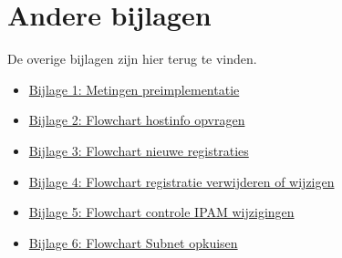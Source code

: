 \documentclass[dutch,dit,thesis]{hogentreport}
\begin{document}


\chapter{Andere bijlagen}
\label{appendix:bijlagen}
De overige bijlagen zijn hier terug te vinden.
\begin{itemize}
    \item \href{run:../Bijlagen/metingen\_preimplementatie.xlsx}{Bijlage 1: Metingen preimplementatie}\label{att:metingen}
    \item \href{run:../Bijlagen/Flowchart\_Hostinfo\_opvragen.jpg}{Bijlage 2: Flowchart hostinfo opvragen}\label{att:flow_info}
    \item \href{run:../Bijlagen/Flowchart\_Nieuwe\_registratie.jpg}{Bijlage 3: Flowchart nieuwe registraties}\label{att:flow_nieuw}
    \item \href{run:../Bijlagen/Flowchart\_Registratie\_verwijderen\_of\_wijzigen.jpg}{Bijlage 4: Flowchart registratie verwijderen of wijzigen}\label{att:flow_wijzig}
    \item \href{run:../Bijlagen/Flowchart\_Controle\_IPAM\_wijzigingen.jpg}{Bijlage 5: Flowchart controle IPAM wijzigingen}\label{att:flow_controle_ipam}
    \item \href{run:../Bijlagen/Flowchart\_Subnet\_opkuis.jpg}{Bijlage 6: Flowchart Subnet opkuisen}\label{att:flow_subnet_kuisen}
\end{itemize}


\backmatter{}

\setlength\bibitemsep{2pt} %
\printbibliography[heading=bibintoc]
\end{document}
